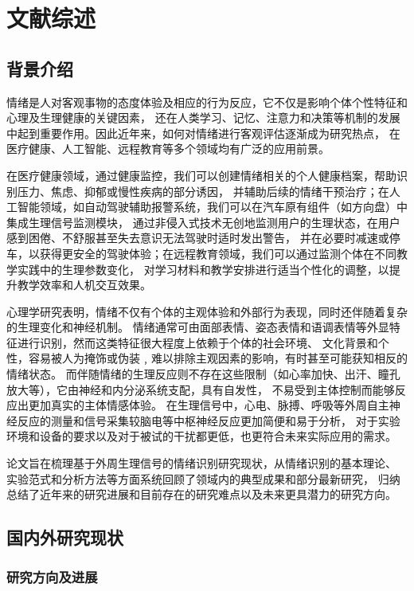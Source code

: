 \cleardoublepage
\newrefsection
\chapter{文献综述}

\section{背景介绍}
情绪是人对客观事物的态度体验及相应的行为反应，它不仅是影响个体个性特征和心理及生理健康的关键因素，
还在人类学习、记忆、注意力和决策等机制的发展中起到重要作用。因此近年来，如何对情绪进行客观评估逐渐成为研究热点，
在医疗健康、人工智能、远程教育等多个领域均有广泛的应用前景。

在医疗健康领域，通过健康监控，我们可以创建情绪相关的个人健康档案，帮助识别压力、焦虑、抑郁或慢性疾病的部分诱因，
并辅助后续的情绪干预治疗；在人工智能领域，如自动驾驶辅助报警系统，我们可以在汽车原有组件（如方向盘）中集成生理信号监测模块，
通过非侵入式技术无创地监测用户的生理状态，在用户感到困倦、不舒服甚至失去意识无法驾驶时适时发出警告，
并在必要时减速或停车，以获得更安全的驾驶体验\cite{Placido2012}；在远程教育领域，我们可以通过监测个体在不同教学实践中的生理参数变化，
对学习材料和教学安排进行适当个性化的调整，以提升教学效率和人机交互效果。

心理学研究表明，情绪不仅有个体的主观体验和外部行为表现，同时还伴随着复杂的生理变化和神经机制。
情绪通常可由面部表情、姿态表情和语调表情等外显特征进行识别，然而这类特征很大程度上依赖于个体的社会环境、
文化背景和个性，容易被人为掩饰或伪装﹐难以排除主观因素的影响，有时甚至可能获知相反的情绪状态。
而伴随情绪的生理反应则不存在这些限制（如心率加快、出汗、瞳孔放大等），它由神经和内分泌系统支配，具有自发性，
不易受到主体控制而能够反应出更加真实的主体情感体验。
在生理信号中，心电、脉搏、呼吸等外周自主神经反应的测量和信号采集较脑电等中枢神经反应更加简便和易于分析，
对于实验环境和设备的要求以及对于被试的干扰都更低，也更符合未来实际应用的需求。

论文旨在梳理基于外周生理信号的情绪识别研究现状，从情绪识别的基本理论、
实验范式和分析方法等方面系统回顾了领域内的典型成果和部分最新研究，
归纳总结了近年来的研究进展和目前存在的研究难点以及未来更具潜力的研究方向。


\section{国内外研究现状}

\subsection{研究方向及进展}
 

